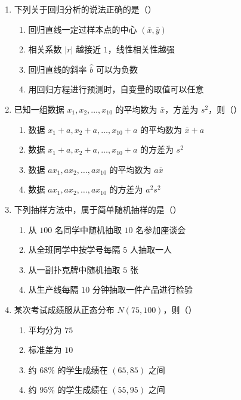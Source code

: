 \documentclass[12pt, a4paper]{ctexart}
\begin{document}
\vspace{6pt}

\begin{enumerate}[resume]
\item 下列关于回归分析的说法正确的是（\quad）
  \begin{enumerate}[label=\Alph*., itemsep=0pt]
    \item 回归直线一定过样本点的中心 $(\bar{x},\bar{y})$
    \item 相关系数 $|r|$ 越接近 $1$，线性相关性越强
    \item 回归直线的斜率 $\hat{b}$ 可以为负数
    \item 用回归方程进行预测时，自变量的取值可以任意
  \end{enumerate}

\item 已知一组数据 $x_1,x_2,\ldots,x_{10}$ 的平均数为 $\bar{x}$，方差为 $s^2$，则（\quad）
  \begin{enumerate}[label=\Alph*., itemsep=0pt]
    \item 数据 $x_1+a,x_2+a,\ldots,x_{10}+a$ 的平均数为 $\bar{x}+a$
    \item 数据 $x_1+a,x_2+a,\ldots,x_{10}+a$ 的方差为 $s^2$
    \item 数据 $ax_1,ax_2,\ldots,ax_{10}$ 的平均数为 $a\bar{x}$
    \item 数据 $ax_1,ax_2,\ldots,ax_{10}$ 的方差为 $a^2s^2$
  \end{enumerate}

\item 下列抽样方法中，属于简单随机抽样的是（\quad）
  \begin{enumerate}[label=\Alph*., itemsep=0pt]
    \item 从 $100$ 名同学中随机抽取 $10$ 名参加座谈会
    \item 从全班同学中按学号每隔 $5$ 人抽取一人
    \item 从一副扑克牌中随机抽取 $5$ 张
    \item 从生产线每隔 $10$ 分钟抽取一件产品进行检验
  \end{enumerate}

\item 某次考试成绩服从正态分布 $N(75,100)$，则（\quad）
  \begin{enumerate}[label=\Alph*., itemsep=0pt]
    \item 平均分为 $75$
    \item 标准差为 $10$
    \item 约 $68\%$ 的学生成绩在 $(65,85)$ 之间
    \item 约 $95\%$ 的学生成绩在 $(55,95)$ 之间
  \end{enumerate}
\end{enumerate}
\end{document}
